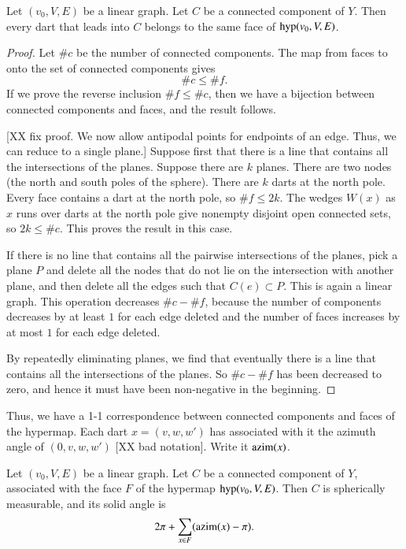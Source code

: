 \begin{lemma}  Let $(v_0,V,E)$ be a linear graph.  Let $C$ be a
connected component of $Y$.  Then every dart that leads
into $C$ belongs to the same face of ${\operatorname{hyp}}(v_0,V,E)$.
\end{lemma}

\begin{proof}  Let $\#c$ be the number of connected components.  The
map from faces to onto the set of connected components gives
        $$\#c \le \#f.$$
If we prove the reverse inclusion $\#f \le \#c$, then we have a
bijection between connected components and faces, and the result
follows.


[XX fix proof. We now allow antipodal points for endpoints of an
edge.  Thus, we can reduce to a single plane.] Suppose first that
there is a line that contains all the intersections of the planes.
Suppose there are $k$ planes. There are two nodes (the north and
south poles of the sphere). There are $k$ darts at the north pole.
Every face contains a dart at the north pole, so $\#f \le 2 k$. The
wedges $W(x)$ as $x$ runs over darts at the north pole give nonempty
disjoint open connected sets, so $2 k \le \#c$.  This proves the
result in this case.

If there is no line that contains all the pairwise intersections of
the planes, pick a plane $P$ and delete all the nodes that do not
lie on the intersection with another plane, and then delete all the
edges such that $C(e)\subset P$.  This is again a linear graph. This
operation decreases $\#c - \#f$, because the number of components
decreases by at least $1$ for each edge deleted and the number of
faces increases by at most $1$ for each edge deleted.

By repeatedly eliminating planes, we find that eventually there is a
line that contains all the intersections of the planes.  So $\#c -
\#f$ has been decreased to zero, and hence it must have been
non-negative in the beginning.
\end{proof}

Thus, we have a 1-1 correspondence between connected components and
faces of the hypermap.  Each dart $x=(v,w,w')$ has associated with
it the azimuth angle of $(0,v,w,w')$ [XX bad notation].  Write it
${\operatorname{azim}}(x)$.

\begin{lemma} Let $(v_0,V,E)$ be a linear graph.  Let $C$ be a connected
component of $Y$, associated with the face $F$ of the
hypermap ${\operatorname{hyp}}(v_0,V,E)$.    Then $C$ is spherically measurable,
and its solid angle  is
    $$2\pi + \sum_{x\in F} ({\operatorname{azim}}(x)-\pi).$$
\end{lemma}


